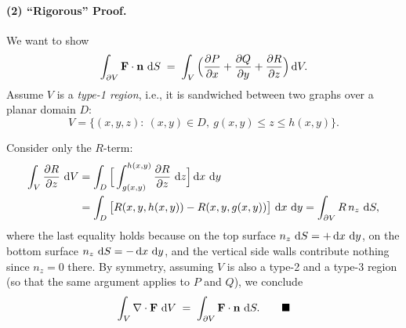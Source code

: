 \begin{nknote}
\paragraph{(2) ``Rigorous'' Proof.}
We want to show
\[
\int_{\partial V} \mathbf{F}\cdot\mathbf{n}\,\mathop{}\!\mathrm{d} S
\;=\;
\int_V \Big(\frac{\partial P}{\partial x} + \frac{\partial Q}{\partial y} + \frac{\partial R}{\partial z}\Big)\mathop{}\!\mathrm{d} V .
\]
Assume $V$ is a \emph{type-1 region}, i.e., it is sandwiched between two graphs over a planar domain $D$:
\[
V = \big\{(x,y,z) :\ (x,y)\in D,\ g(x,y) \le z \le h(x,y)\big\}.
\]
\begin{center}
\end{center}
Consider only the $R$-term:
\begin{align*}
\int_V \frac{\partial R}{\partial z}\,\mathop{}\!\mathrm{d} V
&= \int_D \Big[\int_{g(x,y)}^{h(x,y)} \frac{\partial R}{\partial z}\,\mathop{}\!\mathrm{d} z\Big]\mathop{}\!\mathrm{d} x\,\mathop{}\!\mathrm{d} y \\
&= \int_D \big[R(x,y,h(x,y)) - R(x,y,g(x,y))\big]\,\mathop{}\!\mathrm{d} x\,\mathop{}\!\mathrm{d} y
 = \int_{\partial V} R\, n_z\,\mathop{}\!\mathrm{d} S ,
\end{align*}
where the last equality holds because on the top surface $n_z\,\mathop{}\!\mathrm{d} S = +\mathop{}\!\mathrm{d} x\,\mathop{}\!\mathrm{d} y$, on the bottom surface $n_z\,\mathop{}\!\mathrm{d} S = -\mathop{}\!\mathrm{d} x\,\mathop{}\!\mathrm{d} y$, and the vertical side walls contribute nothing since $n_z = 0$ there. By symmetry, assuming $V$ is also a type-2 and a type-3 region (so that the same argument applies to $P$ and $Q$), we conclude
\[
\int_V \nabla\cdot\mathbf{F}\,\mathop{}\!\mathrm{d} V \;=\; \int_{\partial V} \mathbf{F}\cdot\mathbf{n}\,\mathop{}\!\mathrm{d} S. \qquad\blacksquare
\]
\end{nknote}

\section{\texorpdfstring{}{Multivariate Integration by Parts}}\label{app-sec:multi-ibp}

